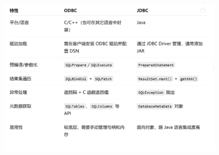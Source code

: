\begin{figure}[H]
    \centering
    \includegraphics[width=0.8\linewidth]{image1.png}
    \caption{}
    \label{}
\end{figure}